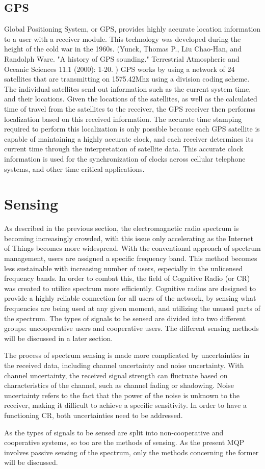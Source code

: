 \subsection{GPS}
Global Positioning System, or GPS, provides highly accurate location information to a user with a receiver module. This technology was developed during the height of the cold war in the 1960s. (Yunck, Thomas P., Liu Chao-Han, and Randolph Ware. "A history of GPS sounding." Terrestrial Atmospheric and Oceanic Sciences 11.1 (2000): 1-20. ) GPS works by using a network of 24 satellites that are transmitting on 1575.42Mhz using a division coding scheme. The individual satellites send out information such as the current system time, and their locations. Given the locations of the satellites, as well as the calculated time of travel from the satellites to the receiver, the GPS receiver then performs localization based on this received information. The accurate time stamping required to perform this localization is only possible because each GPS satellite is capable of maintaining a highly accurate clock, and each receiver determines its current time through the interpretation of satellite data. This accurate clock information is used for the synchronization of clocks across cellular telephone systems, and other time critical applications.

\section{Sensing}
As described in the previous section, the electromagnetic radio spectrum is becoming increasingly crowded, with this issue only accelerating as the Internet of Things becomes more widespread. With the conventional approach of spectrum management, users are assigned a specific frequency band. This method becomes less sustainable with increasing number of users, especially in the unlicensed frequency bands. In order to combat this, the field of Cognitive Radio (or CR) was created to utilize spectrum more efficiently. Cognitive radios are designed to provide a highly reliable connection for all users of the network, by sensing what frequencies are being used at any given moment, and utilizing the unused parts of the spectrum. The types of signals to be sensed are divided into two different groups: uncooperative users and cooperative users. The different sensing methods will be discussed in a later section. \par
The process of spectrum sensing is made more complicated by uncertainties in the received data, including channel uncertainty and noise uncertainty. With channel uncertainty, the received signal strength can fluctuate based on characteristics of the channel, such as channel fading or shadowing. Noise uncertainty refers to the fact that the power of the noise is unknown to the receiver, making it difficult to achieve a specific sensitivity. In order to have a functioning CR, both uncertainties need to be addressed. \par
As the types of signals to be sensed are split into non-cooperative and cooperative systems, so too are the methods of sensing. As the present MQP involves passive sensing of the spectrum, only the methods concerning the former will be discussed.

